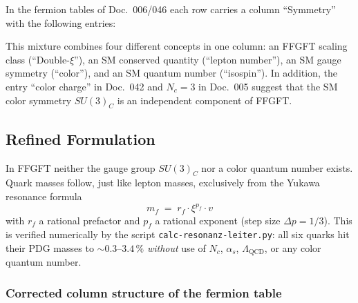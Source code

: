 In the fermion tables of Doc.~006/046 each row carries a column
\enquote{Symmetry} with the following entries:
\begin{center}
{\footnotesize
{}
}
\end{center}

This mixture combines four different concepts in one column:
an FFGFT scaling class (\enquote{Double-$\xi$}), an SM conserved
quantity (\enquote{lepton number}), an SM gauge symmetry
(\enquote{color}), and an SM quantum number (\enquote{isospin}).
In addition, the entry \enquote{color charge} in Doc.~042 and
$N_c = 3$ in Doc.~005 suggest that the SM color symmetry $SU(3)_C$
is an independent component of FFGFT.

\subsection*{Refined Formulation}

In FFGFT neither the gauge group $SU(3)_C$ nor a color quantum number
exists. Quark masses follow, just like lepton masses, exclusively
from the Yukawa resonance formula
\begin{equation}
  m_f \;=\; r_f \cdot \xi^{p_f} \cdot v
  \tag{190.13}
\end{equation}
with $r_f$ a rational prefactor and $p_f$ a rational exponent
(step size $\Delta p = 1/3$). This is verified numerically by
the script \texttt{calc-resonanz-leiter.py}: all six quarks
hit their PDG masses to $\sim 0.3\text{--}3.4\,\%$
\emph{without} use of $N_c$, $\alpha_s$, $\Lambda_{\text{QCD}}$,
or any color quantum number.

\subsubsection*{Corrected column structure of the fermion table}

